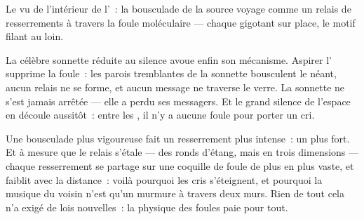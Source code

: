 \begin{omfigure}

{\small Le  vu de l'intérieur de l'~: la bousculade de la
source voyage comme un relais de resserrements à travers la foule
moléculaire --- chaque  gigotant sur place, le motif filant
au loin.}
\end{omfigure}

\begin{example}\label{ex:g7:sound-production:jar}
La célèbre sonnette réduite au silence avoue enfin son mécanisme.
Aspirer l' supprime la foule~: les parois tremblantes de la
sonnette bousculent le néant, aucun relais ne se forme, et aucun
message ne traverse le verre. La sonnette ne s'est jamais arrêtée ---
elle a perdu ses messagers. Et le grand silence de l'espace en
découle aussitôt~: entre les , il n'y a aucune foule pour
porter un cri.
\end{example}

\begin{example}\label{ex:g7:sound-production:loud}
Une bousculade plus vigoureuse fait un resserrement plus intense~:
un  plus fort. Et à mesure que le relais s'étale --- des ronds
d'étang, mais en trois dimensions --- chaque resserrement se partage
sur une coquille de foule de plus en plus vaste, et faiblit avec la
distance~: voilà pourquoi les cris s'éteignent, et pourquoi la
musique du voisin n'est qu'un murmure à travers deux murs. Rien de
tout cela n'a exigé de lois nouvelles~: la physique des foules paie
pour tout.
\end{example}

